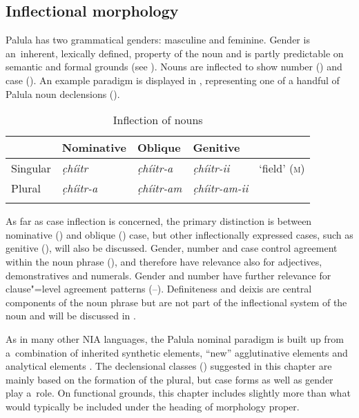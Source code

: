 \subsection{Inflectional morphology}
\label{subsec:4-2-1}

Palula has two grammatical genders: masculine and feminine. Gender is an~inherent, lexically defined, property of the noun and is partly predictable on semantic and formal grounds (see ). Nouns are inflected to show number () and case  (). An example paradigm is displayed in , representing one of a handful of Palula noun declensions (). 


\begin{table}[ht]
\caption{Inflection of nouns}
\begin{tabularx}{\textwidth}{ Q Q Q Q Q }
\lsptoprule
&
Nominative &
Oblique &
Genitive &
\\\hline
Singular &
\textit{c̣híitr} &
\textit{c̣híitr-a} &
\textit{c̣híitr-ii} &
`field' (\textsc{m})\\
Plural &
\textit{c̣híitr-a} &
\textit{c̣híitr-am} &
\textit{c̣híitr-am-ii} &
\\\lspbottomrule
\end{tabularx}
\label{tab:4-nouns}
\end{table}


As far as case inflection is concerned, the primary distinction is between nominative () and oblique () case, but other inflectionally expressed cases, such as genitive (), will also be discussed. Gender, number and case control agreement within the noun phrase (), and therefore have relevance also for adjectives, demonstratives and numerals. Gender and number have further relevance for clause"=level agreement patterns (--). Definiteness and deixis are central components of the noun phrase but are not part of the inflectional system of the noun and will be discussed in .


As in many other NIA languages, the Palula nominal paradigm is built up from a~combination of inherited synthetic elements, ``new'' agglutinative elements and analytical elements \citep[212]{masica1991}. The declensional classes () suggested in this chapter are mainly based on the formation of the plural, but case forms as well as gender play a~role. On functional grounds, this chapter includes slightly more than what would typically be included under the heading of morphology proper.


